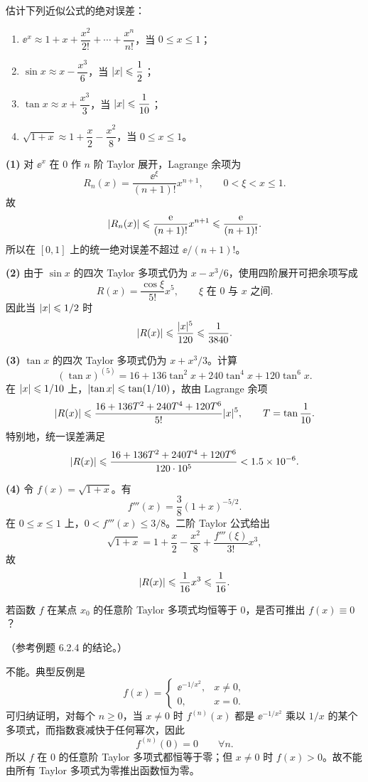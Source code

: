 \begin{xexercise}[8]
估计下列近似公式的绝对误差：
\begin{enumerate}[label=(\arabic*)]
  \item $\ee^x\approx1+x+\dfrac{x^2}{2!}+\cdots+\dfrac{x^n}{n!}$，当 $0\leqslant x\leqslant1$；
  \item $\sin x\approx x-\dfrac{x^3}{6}$，当 $\lvert x\rvert\leqslant\dfrac12$；
  \item $\tan x\approx x+\dfrac{x^3}{3}$，当 $\lvert x\rvert\leqslant\dfrac{1}{10}$；
  \item $\sqrt{1+x}\approx1+\dfrac{x}{2}-\dfrac{x^2}{8}$，当 $0\leqslant x\leqslant1$。
\end{enumerate}
\end{xexercise}
\begin{xsolution}
\textbf{(1)}\quad
对 $\ee^x$ 在 $0$ 作 $n$ 阶 Taylor 展开，Lagrange 余项为
\[
  R_n(x)=\frac{\ee^\xi}{(n+1)!}x^{n+1},
  \qquad0<\xi<x\leqslant1.
\]
故
\[
  \lvert R_n(x)\rvert
  \leqslant\frac{\mathrm{e}}{(n+1)!}x^{n+1}
  \leqslant\frac{\mathrm{e}}{(n+1)!}.
\]
所以在 $[0,1]$ 上的统一绝对误差不超过 $\ee/(n+1)!$。

\textbf{(2)}\quad
由于 $\sin x$ 的四次 Taylor 多项式仍为 $x-x^3/6$，使用四阶展开可把余项写成
\[
  R(x)=\frac{\cos\xi}{5!}x^5,
  \qquad \xi\text{ 在 }0\text{ 与 }x\text{ 之间}.
\]
因此当 $\lvert x\rvert\leqslant1/2$ 时
\[
  \lvert R(x)\rvert\leqslant\frac{\lvert x\rvert^5}{120}
  \leqslant\frac1{3840}.
\]

\textbf{(3)}\quad
$\tan x$ 的四次 Taylor 多项式仍为 $x+x^3/3$。计算
\[
  (\tan x)^{(5)}
  =16+136\tan^2x+240\tan^4x+120\tan^6x.
\]
在 $\lvert x\rvert\leqslant1/10$ 上，$\lvert\tan x\rvert\leqslant\tan(1/10)$，故由 Lagrange 余项
\[
  \lvert R(x)\rvert
  \leqslant
  \frac{16+136T^2+240T^4+120T^6}{5!}\lvert x\rvert^5,
  \qquad T=\tan\frac1{10}.
\]
特别地，统一误差满足
\[
  \lvert R(x)\rvert
  \leqslant
  \frac{16+136T^2+240T^4+120T^6}{120\cdot10^5}
  <1.5\times10^{-6}.
\]

\textbf{(4)}\quad
令 $f(x)=\sqrt{1+x}$。有
\[
  f'''(x)=\frac{3}{8}(1+x)^{-5/2}.
\]
在 $0\leqslant x\leqslant1$ 上，$0<f'''(x)\leqslant3/8$。二阶 Taylor 公式给出
\[
  \sqrt{1+x}=1+\frac x2-\frac{x^2}{8}
  +\frac{f'''(\xi)}{3!}x^3,
\]
故
\[
  \lvert R(x)\rvert\leqslant\frac{1}{16}x^3\leqslant\frac1{16}.
\]
\end{xsolution}


\begin{xexercise}[9]
若函数 $f$ 在某点 $x_0$ 的任意阶 Taylor 多项式均恒等于 0，是否可推出 $f(x)\equiv0$？

（参考例题 6.2.4 的结论。）
\end{xexercise}
\begin{xsolution}
不能。典型反例是
\[
  f(x)=
  \begin{cases}
    \ee^{-1/x^2},&x\neq0,\\
    0,&x=0.
  \end{cases}
\]
可归纳证明，对每个 $n\geqslant0$，当 $x\neq0$ 时 $f^{(n)}(x)$ 都是 $\ee^{-1/x^2}$ 乘以 $1/x$ 的某个多项式，而指数衰减快于任何幂次，因此
\[
  f^{(n)}(0)=0\qquad\forall n.
\]
所以 $f$ 在 $0$ 的任意阶 Taylor 多项式都恒等于零；但 $x\neq0$ 时 $f(x)>0$。故不能由所有 Taylor 多项式为零推出函数恒为零。
\end{xsolution}


